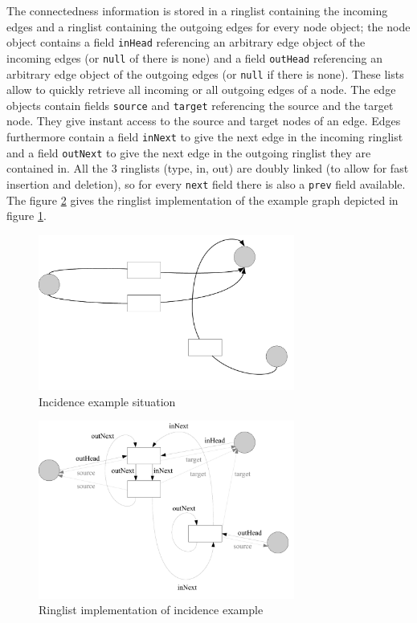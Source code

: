The connectedness information is stored in a ringlist containing the incoming edges and a ringlist containing the outgoing edges for every node object; the node object contains a field \texttt{inHead} referencing an arbitrary edge object of the incoming edges (or \texttt{null} of there is none) and a field \texttt{outHead} referencing an arbitrary edge object of the outgoing edges (or \texttt{null} if there is none).
These lists allow to quickly retrieve all incoming or all outgoing edges of a node.
The edge objects contain fields \texttt{source} and \texttt{target} referencing the source and the target node.
They give instant access to the source and target nodes of an edge.
Edges furthermore contain a field \texttt{inNext} to give the next edge in the incoming ringlist and a field \texttt{outNext} to give the next edge in the outgoing ringlist they are contained in.
All the 3 ringlists (type, in, out) are doubly linked (to allow for fast insertion and deletion), so for every \texttt{next} field there is also a \texttt{prev} field available.
The figure \ref{figincidenceexampleringlists} gives the ringlist implementation of the example graph depicted in figure \ref{figincidenceexample}. 

\begin{figure}[htbp]
  \centering
  \includegraphics[width=0.75\textwidth]{fig/IncidenceExample}
  \caption{Incidence example situation}
  \label{figincidenceexample}
\end{figure}

\begin{figure}[htbp]
  \centering
  \includegraphics[width=0.75\textwidth]{fig/IncidenceExampleRinglists}
  \caption{Ringlist implementation of incidence example}
  \label{figincidenceexampleringlists}
\end{figure}

